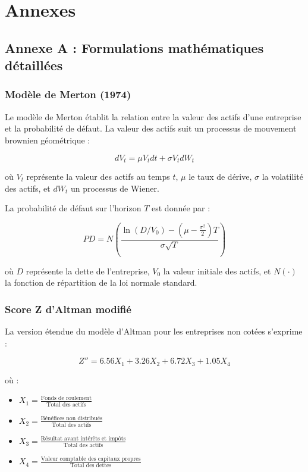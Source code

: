 \chapter{Annexes}

\section{Annexe A : Formulations mathématiques détaillées}

\subsection{Modèle de Merton (1974)}

Le modèle de Merton établit la relation entre la valeur des actifs d'une entreprise et la probabilité de défaut. La valeur des actifs suit un processus de mouvement brownien géométrique :

\begin{equation}
dV_t = \mu V_t dt + \sigma V_t dW_t
\end{equation}

où $V_t$ représente la valeur des actifs au temps $t$, $\mu$ le taux de dérive, $\sigma$ la volatilité des actifs, et $dW_t$ un processus de Wiener.

La probabilité de défaut sur l'horizon $T$ est donnée par :

\begin{equation}
PD = N\left(\frac{\ln(D/V_0) - (\mu - \frac{\sigma^2}{2})T}{\sigma\sqrt{T}}\right)
\end{equation}

où $D$ représente la dette de l'entreprise, $V_0$ la valeur initiale des actifs, et $N(\cdot)$ la fonction de répartition de la loi normale standard.

\subsection{Score Z d'Altman modifié}

La version étendue du modèle d'Altman pour les entreprises non cotées s'exprime :

\begin{equation}
Z'' = 6.56X_1 + 3.26X_2 + 6.72X_3 + 1.05X_4
\end{equation}

où :
\begin{itemize}
\item $X_1 = \frac{\text{Fonds de roulement}}{\text{Total des actifs}}$
\item $X_2 = \frac{\text{Bénéfices non distribués}}{\text{Total des actifs}}$
\item $X_3 = \frac{\text{Résultat avant intérêts et impôts}}{\text{Total des actifs}}$
\item $X_4 = \frac{\text{Valeur comptable des capitaux propres}}{\text{Total des dettes}}$
\end{itemize}

